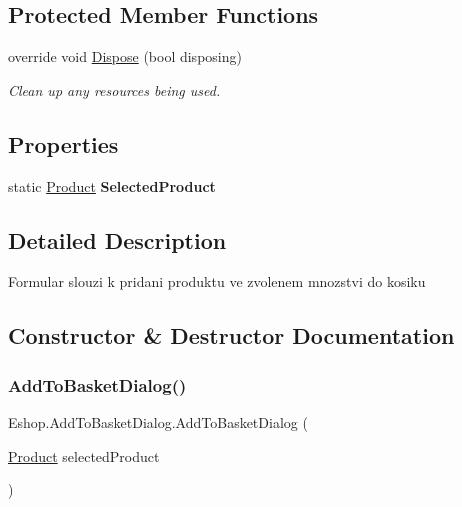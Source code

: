 \subsection*{Protected Member Functions}
\begin{DoxyCompactItemize}
\item 
override void \mbox{\hyperlink{class_eshop_1_1_add_to_basket_dialog_afadad243091fafb1c754033174fbe0c4}{Dispose}} (bool disposing)
\begin{DoxyCompactList}\small\item\em Clean up any resources being used. \end{DoxyCompactList}\end{DoxyCompactItemize}
\subsection*{Properties}
\begin{DoxyCompactItemize}
\item 
\mbox{\label{class_eshop_1_1_add_to_basket_dialog_a83bd1c0b74d27ad81fdc364b640fe90a}} 
static \mbox{\hyperlink{class_eshop_1_1_product}{Product}} {\bfseries Selected\+Product}
\end{DoxyCompactItemize}


\subsection{Detailed Description}
Formular slouzi k pridani produktu ve zvolenem mnozstvi do kosiku 



\subsection{Constructor \& Destructor Documentation}
\mbox{\label{class_eshop_1_1_add_to_basket_dialog_a037b528b8c09773c3f2201b320925598}} 
\subsubsection{\texorpdfstring{AddToBasketDialog()}{AddToBasketDialog()}}
{\footnotesize\ttfamily Eshop.\+Add\+To\+Basket\+Dialog.\+Add\+To\+Basket\+Dialog (\begin{DoxyParamCaption}\item[{\mbox{\hyperlink{class_eshop_1_1_product}{Product}}}]{selected\+Product }\end{DoxyParamCaption})}



